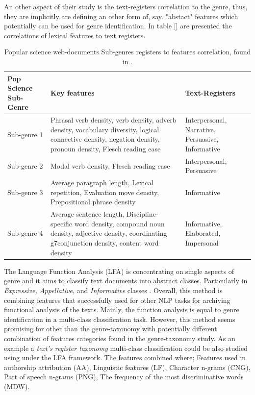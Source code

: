 An other aspect of their study is the text-registers correlation to the genre, thus, they are implicitly are defining an other form of, say. "abstact" features which potentially can be used for genre identification. In table \ref{} are presented the correlations of lexical features to text registers.

\begin{table}[t]
	\center
	\caption {Popular science web-documents Sub-genres registers to features correlation, found in \parencite{lieungnapar2017genre}.}\label{chap:relevant_work:tbl:pop_science_registers_features}
	\begin{tabular}{p{4cm}p{7cm}p{3cm}}
		\hline
		Pop Science Sub-Genre & Key features & Text-Registers \\
		\hline
		 Sub-genre 1 & Phrasal verb density, verb density, adverb density, vocabulary diversity, logical connective density, negation density, pronoun density, Flesch reading ease & Interpersonal, Narrative, Persuasive, Informative \\
         Sub-genre 2 & Modal verb density, Flesch reading ease & Interpersonal, Persuasive \\
         Sub-genre 3 & Average paragraph length, Lexical repetition, Evaluation move density, Prepositional phrase density & Informative\\
         Sub-genre 4 & Average sentence length, Discipline-specific word density, compound noun density, adjective density, coordinating g7conjunction density, content word density & Informative, Elaborated, Impersonal  \\
  		\hline
	\end{tabular}
\end{table}

The Language Function Analysis (LFA) is concentrating on single aspects of genre and it aims to classify text documents into abstract  classes. Particularly in \textit{Expressive, Appellative,} and \textit{Informative} classes \parencite{onan2018ensemble}. Overall, this method is combining features that successfully used for other NLP tasks for archiving functional analysis of the texts. Mainly, the function analysis is equal to genre identification in a multi-class classification task. However, this method seems promising for other than the genre-taxonomy with potentially different combination of features categories found in the genre-taxonomy study. As an example a \textit{text's register taxonomy} multi-class classification could be also studied using under the LFA framework. The features combined where; Features used in authorship attribution (AA), Linguistic features (LF), Character n-grams (CNG), Part of speech n-grams (PNG), The frequency of the most discriminative words (MDW).


